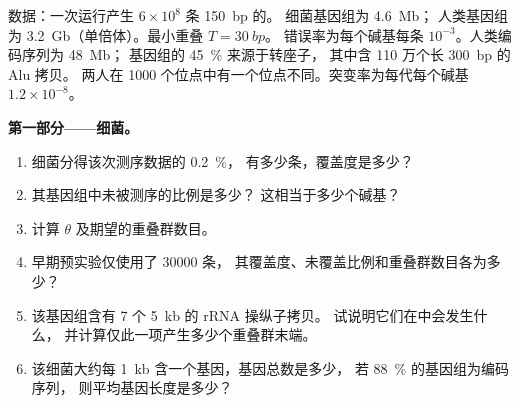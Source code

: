 \begin{problem}
\label{pb:b3:genomics:1}
数据：一次运行产生 $6\times 10^{8}$ 条 \qty{150}{bp} 的。
细菌基因组为 \qty{4.6}{Mb}；
人类基因组为 \qty{3.2}{Gb}（单倍体）。最小重叠 $T = \qty{30}{bp}$。
错误率为每个碱基每条 $10^{-3}$。人类编码序列为 \qty{48}{Mb}；
基因组的 \qty{45}{\%} 来源于转座子，
其中含 110 万个长 \qty{300}{bp} 的 Alu 拷贝。
两人在 \num{1000} 个位点中有一个位点不同。突变率为每代每个碱基 $1.2\times 10^{-8}$。

\medskip
\noindent\textbf{第一部分——细菌。}
\begin{enumerate}
  \item 细菌分得该次测序数据的 \qty{0.2}{\%}，
        有多少条，覆盖度是多少？
  \item 其基因组中未被测序的比例是多少？
        这相当于多少个碱基？
  \item 计算 $\theta$ 及期望的重叠群数目。
  \item 早期预实验仅使用了 \num{30000} 条，
        其覆盖度、未覆盖比例和重叠群数目各为多少？
  \item 该基因组含有 \num{7} 个 \qty{5}{kb} 的 rRNA 操纵子拷贝。
        试说明它们在中会发生什么，
        并计算仅此一项产生多少个重叠群末端。
  \item 该细菌大约每 \qty{1}{kb} 含一个基因，基因总数是多少，
        若 \qty{88}{\%} 的基因组为编码序列，
        则平均基因长度是多少？
\end{enumerate}


\end{problem}
